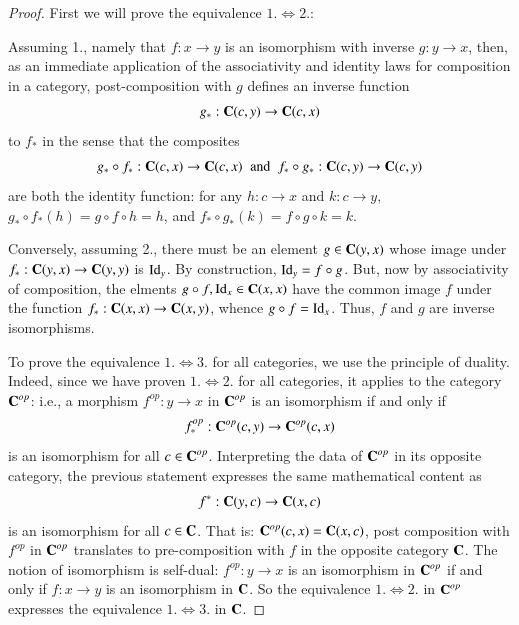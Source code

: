 \documentclass[12pt, a4paper, oneside, openright, titlepage]{book}
\begin{document}
\begin{proof}
    First we will prove the equivalence $1. \iff 2.$:

    Assuming 1., namely that $f:x\rightarrow y$ is an isomorphism with inverse $g:y\rightarrow x$, then, as an immediate application of the associativity and identity laws for composition in a category, post-composition with $g$ defines an inverse function \begin{equation*}
        g_*:\normalfont\textbf{C}(c,y)\rightarrow \normalfont\textbf{C}(c,x)
    \end{equation*}
    to $f_*$ in the sense that the composites \begin{equation*}
        g_*\circ f_*:\normalfont\textbf{C}(c,x)\rightarrow \normalfont\textbf{C}(c,x)\;\;\text{and}\;\;f_*\circ g_*:\normalfont\textbf{C}(c,y)\rightarrow \normalfont\textbf{C}(c,y)
    \end{equation*}
    are both the identity function: for any $h:c\rightarrow x$ and $k:c\rightarrow y$, $g_*\circ f_*(h) = g\circ f\circ h = h$, and $f_*\circ g_*(k) = f\circ g \circ k = k$.

    Conversely, assuming 2., there must be an element $g \in \normalfont\textbf{C}(y,x)$ whose image under $f_*:\normalfont\textbf{C}(y,x)\rightarrow \normalfont\textbf{C}(y,y)$ is $\operatorname{Id}_y$. By construction, $\operatorname{Id}_y = f\circ g$. But, now by associativity of composition, the elments $g\circ f, \operatorname{Id}_x \in \normalfont\textbf{C}(x,x)$ have the common image $f$ under the function $f_*:\normalfont\textbf{C}(x,x)\rightarrow \normalfont\textbf{C}(x,y)$, whence $g\circ f = \operatorname{Id}_x$. Thus, $f$ and $g$ are inverse isomorphisms.

    To prove the equivalence $1.\iff 3.$ for all categories, we use the principle of duality. Indeed, since we have proven $1.\iff 2.$ for all categories, it applies to the category $\normalfont\textbf{C}^{op}$: i.e., a morphism $f^{op}:y\rightarrow x$ in $\normalfont\textbf{C}^{op}$ is an isomorphism if and only if \begin{equation*}
        f_*^{op}:\normalfont\textbf{C}^{op}(c,y)\rightarrow \normalfont\textbf{C}^{op}(c,x)
    \end{equation*}
    is an isomorphism for all $c \in \normalfont\textbf{C}^{op}$. Interpreting the data of $\normalfont\textbf{C}^{op}$ in its opposite category, the previous statement expresses the same mathematical content as \begin{equation*}
        f^*:\normalfont\textbf{C}(y,c)\rightarrow\normalfont\textbf{C}(x,c)
    \end{equation*}
    is an isomorphism for all $c \in \normalfont\textbf{C}$. That is: $\normalfont\textbf{C}^{op}(c,x) = \normalfont\textbf{C}(x,c)$, post composition with $f^{op}$ in $\normalfont\textbf{C}^{op}$ translates to pre-composition with $f$ in the opposite category $\normalfont\textbf{C}$. The notion of isomorphism is self-dual: $f^{op}:y\rightarrow x$ is an isomorphism in $\normalfont\textbf{C}^{op}$ if and only if $f:x\rightarrow y$ is an isomorphism in $\normalfont\textbf{C}$. So the equivalence $1.\iff 2.$ in $\normalfont\textbf{C}^{op}$ expresses the equivalence $1.\iff 3.$ in $\normalfont\textbf{C}$.
\end{proof}
\end{document}
